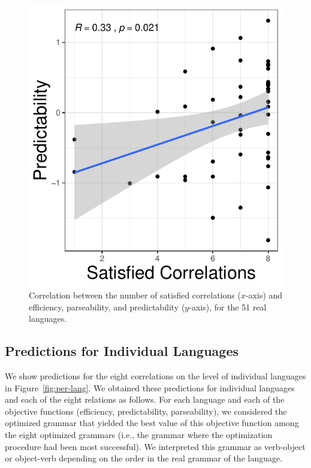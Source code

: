 \documentclass[10pt,twoside,lineno]{article}
\begin{document}
\begin{figure}[ht]
    \includegraphics[scale=.55]{../results/correlations/correlations-by-grammar/ground-corrs-predictability.pdf}

	\caption{Correlation between the number of satisfied correlations ($x$-axis) and efficiency, parseability, and predictability ($y$-axis), for the 51 real languages.}
    \label{fig:corr-eff-corr}
\end{figure}



\subsection{Predictions for Individual Languages}


We show predictions for the eight correlations on the level of individual languages in Figure~\ref{fig:per-lang}.
We obtained these predictions for individual languages and each of the eight relations as follows.
For each language and each of the objective functions (efficiency, predictability, parseability), we considered the optimized grammar that yielded the best value of this objective function among the eight optimized grammars (i.e., the grammar where the optimization procedure had been most successful).
We interpreted this grammar as verb-object or object-verb depending on the order in the real grammar of the language.
\end{document}
